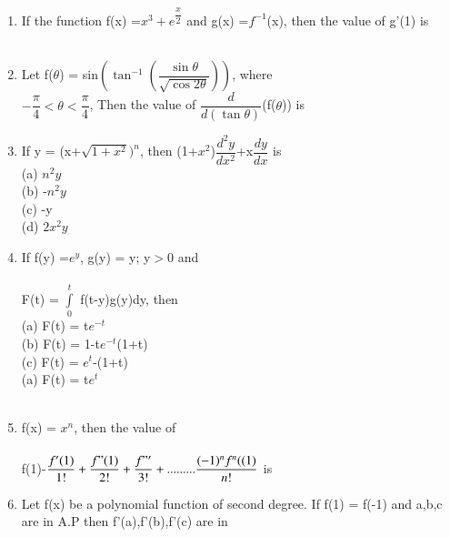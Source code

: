 \documentclass[journal,12pt,onecoloumn]{IEEEtran}
\begin{document}
\begin{enumerate}[label=\arabic*]
	\\
	\item If the function f(x) =$x^3 + e^{\dfrac{x}{2}}$ and g(x) =$f^{-1}$(x), then the value of g'(1) is\\
	\\
	\item Let f($\theta$) = sin$\left(\tan^{-1}\left(\dfrac{\sin \theta}{\sqrt{\cos2\theta}}\right)\right)$, where\\
	 $-\dfrac{\pi}{4}<\theta<\dfrac{\pi}{4}$, Then the value of $\dfrac{d}{d(\tan \theta)}$(f($\theta$)) is 
	\item If y = (x+$\sqrt{1+x^2})^n$, then (1+$x^2$)$\dfrac{d^2y}{dx^2}$+x$\dfrac{dy}{dx}$ is\\
	(a) $n^2y$\\
	(b) -$n^2y$\\
	(c) -y\\
	(d) $2x^2y$\\
	\item If f(y) =$e^y$, g(y) = y; y$>$0 and\\
	 \\
	 F(t) = $\int\limits_0^t$ f(t-y)g(y)dy, then\\
	 (a) F(t) = t$e^{-t}$\\
	 (b) F(t) = 1-t$e^{-t}$(1+t)\\
	 (c) F(t) = $e^{t}$-(1+t)\\
	 (a) F(t) = t$e^{t}$\\
	\\
	\item f(x) = $x^n$, then the value of\\
	\\
	f(1)-$\dfrac{f'(1)}{1!} + \dfrac{f"(1)}{2!} + \dfrac{f"'}{3!}+.........\dfrac{(-1)^n f^n((1)}{n!}$ is\\
	\begin{itemize}
	\begin{multicols}{4}
	\item [(a)]1
	\item [(b)]$2^n$
	\item [(c)]$2^n$-1
	\item [(d)]0
	
	\end{multicols}
	\end{itemize}
	\item Let f(x) be a polynomial function of second degree. If f(1) = f(-1) and a,b,c are in A.P then f'(a),f'(b),f'(c) are in\\
	

\end{enumerate}
\end{document}
